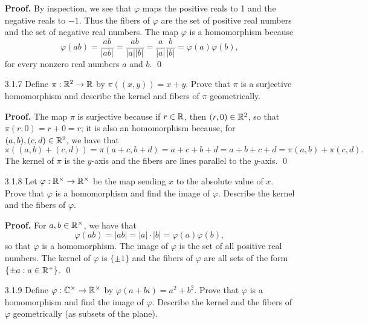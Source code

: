 \begin{enumerate}
      \textbf{Proof.} By inspection, we see that $\varphi$ maps the positive
      reals to 1 and the negative reals to $-1$. Thus the fibers of $\varphi$
      are the set of positive real numbers and the set of negative real numbers.
      The map $\varphi$ is a homomorphism because
      $$\varphi(ab) = \frac{ab}{|ab|} = \frac{ab}{|a||b|} = \frac{a}{|a|}
        \frac{b}{|b|} = \varphi(a)\varphi(b),$$
      for every nonzero real numbers $a$ and $b$. \qed
   \item[3.1.7]   Define $\pi : \mathbb{R}^2 \rightarrow \mathbb{R}$ by $\pi((x, y)) = x + y$.
                  Prove that $\pi$ is a surjective homomorphism and describe the
                  kernel and fibers of $\pi$ geometrically.

      \textbf{Proof.} The map $\pi$ is surjective because if $r \in \mathbb{R}$, then
      $(r, 0) \in \mathbb{R}^2$, so that $\pi(r, 0) = r + 0 = r$; it is also an
      homomorphism because, for $(a, b), (c, d) \in \mathbb{R}^2$, we have that
      $$\pi((a, b) + (c, d)) = \pi(a + c, b + d) = a + c + b + d =
        a + b + c + d =\pi(a, b) + \pi(c, d).$$
      The kernel of $\pi$ is the $y$-axis and the fibers are lines parallel to
      the $y$-axis. \qed
   \item[3.1.8]   Let $\varphi : \mathbb{R}^\times \rightarrow \mathbb{R}^\times$ be the map
                  sending $x$ to the absolute value of $x$. Prove that $\varphi$
                  is a homomorphism and find the image of $\varphi$. Describe
                  the kernel and the fibers of $\varphi$.

      \textbf{Proof.} For $a, b \in \mathbb{R}^\times$, we have that
      $$\varphi(ab) = |ab| = |a| \cdot |b| = \varphi(a)\varphi(b),$$
      so that $\varphi$ is a homomorphism. The image of $\varphi$ is the set of
      all positive real numbers. The kernel of $\varphi$ is $\{\pm 1\}$ and the
      fibers of $\varphi$ are all sets of the form
      $\{\pm a : a \in \mathbb{R}^+\}$. \qed
   \item[3.1.9]   Define $\varphi : \mathbb{C}^\times \rightarrow \mathbb{R}^\times$ by
                  $\varphi(a + bi) = a^2 + b^2$. Prove that $\varphi$ is a
                  homomorphism and find the image of $\varphi$. Describe the
                  kernel and the fibers of $\varphi$ geometrically (as subsets
                  of the plane).


\end{enumerate}
